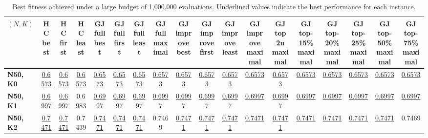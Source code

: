 \begin{table}[ht]
\caption{Best fitness achieved under a large budget of 1,000,000 evaluations. Underlined values indicate the best performance for each instance.}
\label{tab:budget1000k}
\centering
\setlength{\tabcolsep}{4pt} %
\begin{scriptsize}
\begin{tabular}{l | c c c c c c c c c c c c c c c c c}
\hline
$(N,K)$                     & HC best                     & HC first                    & HC least                    & GJ full best                & GJ full first               & GJ full least               & GJ full maximal             & GJ improve best             & GJ improve first            & GJ improve least            & GJ improve maximal          & GJ top 2n maximal           & GJ top-15\% maximal         & GJ top-20\% maximal         & GJ top-25\% maximal         & GJ top-50\% maximal         & GJ top-75\% maximal        \\
\hline
\textbf{N50, K0}            & \underline{0.6573}          & \underline{0.6573}          & \underline{0.6573}          & \underline{0.6573}          & \underline{0.6573}          & \underline{0.6573}          & \underline{0.6573}          & \underline{0.6573}          & \underline{0.6573}          & \underline{0.6573}          & \underline{0.6573}          & \underline{0.6573}          & \underline{0.6573}          & \underline{0.6573}          & \underline{0.6573}          & \underline{0.6573}          & \underline{0.6573}         \\
\textbf{N50, K1}            & \underline{0.6997}          & \underline{0.6997}          & 0.6983                      & \underline{0.6997}          & \underline{0.6997}          & \underline{0.6997}          & \underline{0.6997}          & \underline{0.6997}          & \underline{0.6997}          & \underline{0.6997}          & \underline{0.6997}          & \underline{0.6997}          & \underline{0.6997}          & \underline{0.6997}          & \underline{0.6997}          & \underline{0.6997}          & \underline{0.6997}         \\
\textbf{N50, K2}            & \underline{0.7471}          & \underline{0.7471}          & 0.7439                      & \underline{0.7471}          & \underline{0.7471}          & \underline{0.7471}          & 0.7469                      & \underline{0.7471}          & \underline{0.7471}          & \underline{0.7471}          & \underline{0.7471}          & \underline{0.7471}          & \underline{0.7471}          & \underline{0.7471}          & \underline{0.7471}          & \underline{0.7471}          & 0.7469                     \\

\end{tabular}
\end{scriptsize}
\end{table}
